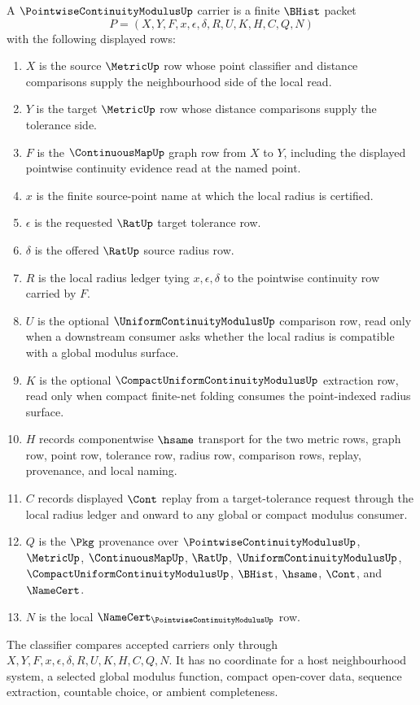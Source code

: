 \begin{definition}
\label{def:pointwise-continuity-modulus-carrier}
A $\PointwiseContinuityModulusUp$ carrier is a finite $\BHist$ packet
$$
P=(X,Y,F,x,\epsilon,\delta,R,U,K,H,C,Q,N)
$$
with the following displayed rows:
\begin{enumerate}
\item $X$ is the source $\MetricUp$ row whose point classifier and distance comparisons supply the neighbourhood side of the local read.
\item $Y$ is the target $\MetricUp$ row whose distance comparisons supply the tolerance side.
\item $F$ is the $\ContinuousMapUp$ graph row from $X$ to $Y$, including the displayed pointwise continuity evidence read at the named point.
\item $x$ is the finite source-point name at which the local radius is certified.
\item $\epsilon$ is the requested $\RatUp$ target tolerance row.
\item $\delta$ is the offered $\RatUp$ source radius row.
\item $R$ is the local radius ledger tying $x,\epsilon,\delta$ to the pointwise continuity row carried by $F$.
\item $U$ is the optional $\UniformContinuityModulusUp$ comparison row, read only when a downstream consumer asks whether the local radius is compatible with a global modulus surface.
\item $K$ is the optional $\CompactUniformContinuityModulusUp$ extraction row, read only when compact finite-net folding consumes the point-indexed radius surface.
\item $H$ records componentwise $\hsame$ transport for the two metric rows, graph row, point row, tolerance row, radius row, comparison rows, replay, provenance, and local naming.
\item $C$ records displayed $\Cont$ replay from a target-tolerance request through the local radius ledger and onward to any global or compact modulus consumer.
\item $Q$ is the $\Pkg$ provenance over $\PointwiseContinuityModulusUp$, $\MetricUp$, $\ContinuousMapUp$, $\RatUp$, $\UniformContinuityModulusUp$, $\CompactUniformContinuityModulusUp$, $\BHist$, $\hsame$, $\Cont$, and $\NameCert$.
\item $N$ is the local $\NameCert_{\PointwiseContinuityModulusUp}$ row.
\end{enumerate}
The classifier compares accepted carriers only through $X,Y,F,x,\epsilon,\delta,R,U,K,H,C,Q,N$. It has no coordinate for a host neighbourhood system, a selected global modulus function, compact open-cover data, sequence extraction, countable choice, or ambient completeness.
\end{definition}

